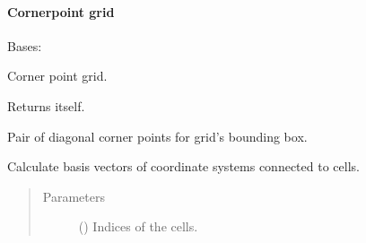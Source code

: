 \documentclass[letterpaper,10pt,english]{sphinxmanual}
\begin{document}
\paragraph{Corner\sphinxhyphen{}point grid}
\label{\detokenize{api/grids:corner-point-grid}}

\begin{fulllineitems}
\label{\detokenize{api/grids:geology.src.CornerPointGrid}}
Bases: 

Corner point grid.

\begin{fulllineitems}
\label{\detokenize{api/grids:geology.src.CornerPointGrid.as_corner_point}}
Returns itself.

\end{fulllineitems}


\begin{fulllineitems}
\label{\detokenize{api/grids:geology.src.CornerPointGrid.bounding_box}}
Pair of diagonal corner points for grid’s bounding box.

\end{fulllineitems}


\begin{fulllineitems}
\label{\detokenize{api/grids:geology.src.CornerPointGrid.cell_bases}}
Calculate basis vectors of coordinate systems connected to cells.
\begin{quote}\begin{description}
\item[{Parameters}] \leavevmode
{} (\sphinxstyleliteralemphasis{\sphinxupquote{{[}}}\sphinxstyleliteralemphasis{\sphinxupquote{{]}}}) \textendash{} Indices of the cells.


\end{description}
\end{quote}
\end{fulllineitems}
\end{fulllineitems}
\end{document}
